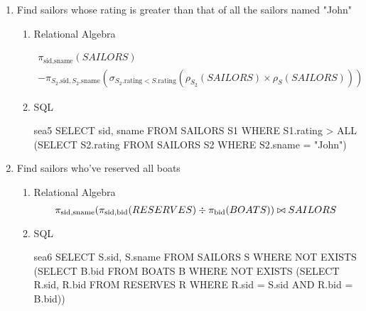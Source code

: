 \begin{enumerate}
      \item  Find sailors whose rating is greater than that of all the sailors named "John"
            \begin{enumerate}
                  \item Relational Algebra

                        \begin{multline*}
                              \pi_{\text{sid}, \text{sname}}(SAILORS) \\
                              - \pi_{S_2.\text{sid},S_2.\text{sname}}(\sigma_{S_2.\text{rating} < S.\text{rating}}(\rho_{S_2}(SAILORS)\times \rho_S(SAILORS)))
                        \end{multline*}

                  \item SQL

                        \begin{sqlQuery}{sea5}
                        SELECT sid, sname FROM SAILORS S1
                        WHERE S1.rating > ALL
                                (SELECT S2.rating FROM SAILORS S2
                                WHERE S2.sname = "John")
                    \end{sqlQuery}

            \end{enumerate}

      \item Find sailors who've reserved all boats

            \begin{enumerate}
                  \item Relational Algebra
                        \begin{equation*}
                              \pi_{\text{sid}, \text{sname}}(\pi_{\text{sid}, \text{bid}}(RESERVES) \div \pi_{\text{bid}}(BOATS)) \\
                              \bowtie SAILORS
                        \end{equation*}
                        \pagebreak
                  \item SQL
                        \begin{sqlQuery}{sea6}
                        SELECT S.sid, S.sname
                        FROM SAILORS S
                        WHERE NOT EXISTS
                              (SELECT B.bid
                              FROM BOATS B
                              WHERE NOT EXISTS
                                    (SELECT R.sid, R.bid
                                    FROM RESERVES R
                                    WHERE R.sid = S.sid
                                          AND R.bid = B.bid))
                  \end{sqlQuery}
            \end{enumerate}


\end{enumerate}
